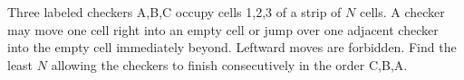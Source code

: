 Three labeled checkers A,B,C occupy cells 1,2,3 of a strip of $N$ cells. A checker may move one cell right into an empty cell or jump over one adjacent checker into the empty cell immediately beyond. Leftward moves are forbidden. Find the least $N$ allowing the checkers to finish consecutively in the order C,B,A.

